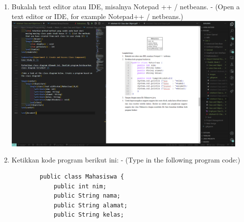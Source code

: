 \documentclass[12pt,titlepage]{article}
\begin{document}
\begin{enumerate}
    \item Bukalah text editor atau IDE, misalnya Notepad ++ / netbeans. - (Open a text editor or IDE, for example Notepad++ / netbeans.) \\
    \includegraphics[width=0.95\textwidth]{images/figures/fig1.png}
    \item Ketikkan kode program berikut ini: - (Type in the following program code:)
    \begin{verbatim}
        public class Mahasiswa {
            public int nim;
            public String nama;
            public String alamat;
            public String kelas;


\end{verbatim}
\end{enumerate}
\end{document}

